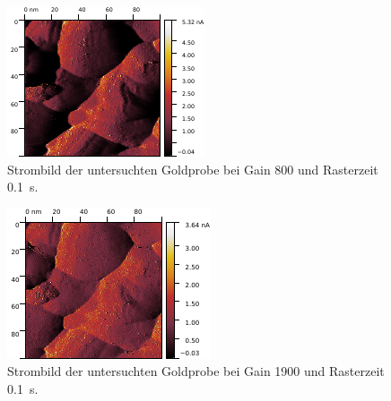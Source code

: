 \begin{figure}[H]
\centering
\includegraphics[width=\textwidth]{../Gwyddion/Gold/GAIN_slow_I_forward.pdf}
\caption{Strombild der untersuchten Goldprobe bei Gain 800 und Rasterzeit \SI{0.1}{s}.}
\label{GAIN_slow_I}
\end{figure}

\begin{figure}[H]
\centering
\includegraphics[width=\textwidth]{../Gwyddion/Gold/GAIN_opt_I_forward.pdf}
\caption{Strombild der untersuchten Goldprobe bei Gain 1900 und Rasterzeit \SI{0.1}{s}.}
\label{GAIN_opt_I}
\end{figure}

